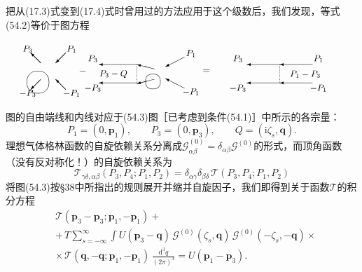 把从(17.3)式变到(17.4)式时曾用过的方法应用于这个级数后，我们发现，等式(54.2)等价于图方程
\begin{equation}
\setlength{\unitlength}{0.75pt}%
\begin{picture}(430,84)(0,0)
  \put(19,23){\oval(30,30)}
  \put(23,49){\vector(-1,1){14}}
  \put(5,68){\makebox(0,0){\small$P_3$}}
  \put(57,63){\vector(-1,-1){14}}
  \put(65,68){\makebox(0,0){\small$P_1$}}
  \put(23,27){\vector(-1,-1){14}}
  \put(5,8){\makebox(0,0){\small$-P_3$}}
  \put(57,13){\vector(-1,1){14}}
  \put(65,8){\makebox(0,0){\small$-P_1$}}
  \put(80,38){\makebox(0,0){$-$}}
  \put(94,55){\makebox(0,0){\small$P_3$}}
  \put(154,47){\vector(-1,0){52}}
  \multiput(154,47)(0,-2){13}{\line(0,-1){1}}
  \put(122,34){\makebox(0,0){\small$P_3-Q$}}
  \put(154,22){\vector(-1,0){52}}
  \put(94,15){\makebox(0,0){\small$-P_3$}}
  \put(176,24){\oval(20,20)}
  \put(178,41){\vector(-4,1){24}}
  \put(178,27){\vector(-4,-1){24}}
  \put(219,57){\vector(-2,-1){26}}
  \put(228,62){\makebox(0,0){\small$P_1$}}
  \put(219,15){\vector(-2,1){26}}
  \put(228,10){\makebox(0,0){\small$-P_1$}}
  \put(249,38){\makebox(0,0){$=$}}
  \put(292,55){\makebox(0,0){\small$P_3$}}
  \put(349,47){\vector(-1,0){45}}
  \put(394,47){\vector(-1,0){45}}
  \put(402,55){\makebox(0,0){\small$P_1$}}
  \multiput(349,47)(0,-2){13}{\line(0,-1){1}}
  \put(384,34){\makebox(0,0){\small$P_1-P_3$}}
  \put(292,15){\makebox(0,0){\small$-P_3$}}
  \put(349,22){\vector(-1,0){45}}
  \put(394,22){\vector(-1,0){45}}
  \put(402,15){\makebox(0,0){\small$-P_1$}}
\end{picture}
\end{equation}
图的自由端线和内线对应于(54.3)图［已考虑到条件(54.1)］中所示的各宗量：
\begin{equation*}
P_1=(0,\bm{p}_1),\qquad P_3=(0,\bm{p}_3),\qquad Q=(\mathrm{i}\zeta_s,\bm{q}).
\end{equation*}
理想气体格林函数的自旋依赖关系分离成$\mathcal{G}^{(0)}_{\alpha\beta}=\delta_{\alpha\beta}\mathcal{G}^{(0)}$的形式，而顶角函数（没有反对称化！）的自旋依赖关系为
\begin{equation*}
\mathcal{T}_{\gamma\delta,\alpha\beta}(P_3,P_4;P_1,P_2)
=\delta_{\alpha\gamma}\delta_{\beta\delta}\,\mathcal{T}(P_3,P_4;P_1,P_2)
\end{equation*}
将图(54.3)按§38中所指出的规则展开并缩并自旋因子，我们即得到关于函数$\mathcal{T}$的积分方程
\begin{equation}
\begin{aligned}
&\mathcal{T}(\bm{p}_3-\bm{p}_3;\bm{p}_1,-\bm{p}_1)+\\
&+\,T\sum_{s=-\infty}^{\infty}\int
U(\bm{p}_3-\bm{q})\,\mathcal{G}^{(0)}(\zeta_s,\bm{q})\,
\mathcal{G}^{(0)}(-\zeta_s,-\bm{q})\times\\
&\times\,\mathcal{T}(\bm{q},-\bm{q};\bm{p}_1,-\bm{p}_1)\,
\frac{\mathrm{d}^3q}{(2\pi)^3}=U(\bm{p}_1-\bm{p}_3).
\end{aligned}
\end{equation}
